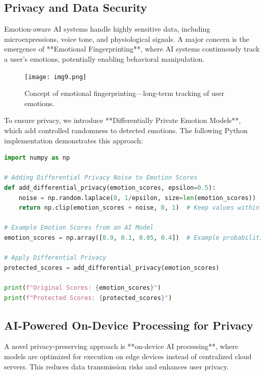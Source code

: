 \documentclass[a4paper,10pt]{article}
\begin{document}
\subsection{Privacy and Data Security}
Emotion-aware AI systems handle highly sensitive data, including microexpressions, voice tone, and physiological signals. A major concern is the emergence of **Emotional Fingerprinting**, where AI systems continuously track a user's emotions, potentially enabling behavioral manipulation.

\begin{figure}[h]
    \centering
    \texttt{[image: img9.png]}
    \caption{Concept of emotional fingerprinting—long-term tracking of user emotions.}
    \label{fig:emotional_fingerprinting}
\end{figure}

To ensure privacy, we introduce **Differentially Private Emotion Models**, which add controlled randomness to detected emotions. The following Python implementation demonstrates this approach:

\begin{lstlisting}[language=Python, caption=Applying Differential Privacy to Emotion Detection, label=lst:differential_privacy, basicstyle=\ttfamily\footnotesize]
import numpy as np

# Adding Differential Privacy Noise to Emotion Scores
def add_differential_privacy(emotion_scores, epsilon=0.5):
    noise = np.random.laplace(0, 1/epsilon, size=len(emotion_scores))
    return np.clip(emotion_scores + noise, 0, 1)  # Keep values within probability range

# Example Emotion Scores from an AI Model
emotion_scores = np.array([0.9, 0.1, 0.05, 0.4])  # Example probabilities for emotions

# Apply Differential Privacy
protected_scores = add_differential_privacy(emotion_scores)

print(f"Original Scores: {emotion_scores}")
print(f"Protected Scores: {protected_scores}")
\end{lstlisting}

\subsection{AI-Powered On-Device Processing for Privacy}
A novel privacy-preserving approach is **on-device AI processing**, where models are optimized for execution on edge devices instead of centralized cloud servers. This reduces data transmission risks and enhances user privacy.
\end{document}
